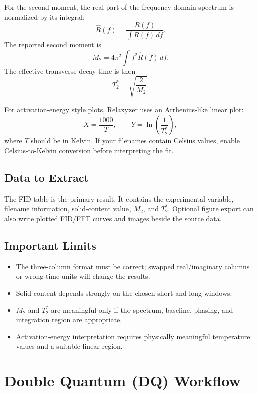 \documentclass[11pt,a4paper]{article}
\newcommand{\Relaxyzer}{Relaxyzer}
\newcommand{\TtwoStar}{\ensuremath{T_2^{\ast}}}
\newcommand{\Mtwo}{\ensuremath{M_2}}
\begin{document}
For the second moment, the real part of the frequency-domain spectrum is normalized by its integral:
\begin{equation}
\hat{R}(f)=\frac{R(f)}{\int R(f)\,df}.
\end{equation}
The reported second moment is
\begin{equation}
\Mtwo=4\pi^2\int f^2\hat{R}(f)\,df.
\end{equation}
The effective transverse decay time is then
\begin{equation}
\TtwoStar=\sqrt{\frac{2}{\Mtwo}}.
\end{equation}

For activation-energy style plots, \Relaxyzer{} uses an Arrhenius-like linear plot:
\begin{equation}
X=\frac{1000}{T},\qquad Y=\ln\left(\frac{1}{\TtwoStar}\right),
\end{equation}
where \(T\) should be in Kelvin. If your filenames contain Celsius values, enable Celsius-to-Kelvin conversion before interpreting the fit.

\subsection{Data to Extract}
The FID table is the primary result. It contains the experimental variable, filename information, solid-content value, \Mtwo{}, and \TtwoStar{}. Optional figure export can also write plotted FID/FFT curves and images beside the source data.

\subsection{Important Limits}
\begin{itemize}
  \item The three-column format must be correct; swapped real/imaginary columns or wrong time units will change the results.
  \item Solid content depends strongly on the chosen short and long windows.
  \item \Mtwo{} and \TtwoStar{} are meaningful only if the spectrum, baseline, phasing, and integration region are appropriate.
  \item Activation-energy interpretation requires physically meaningful temperature values and a suitable linear region.
\end{itemize}

\section{Double Quantum (DQ) Workflow}
\end{document}
